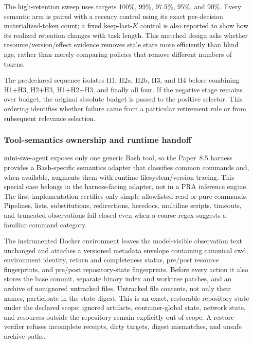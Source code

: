 \documentclass[11pt]{article}
\begin{document}
The high-retention sweep uses targets 100\%, 99\%, 97.5\%, 95\%, and 90\%.
Every semantic arm is paired with a recency control using its exact
per-decision materialized-token count; a fixed keep-last-$K$ control is also
reported to show how its realized retention changes with task length.  This
matched design asks whether resource/version/effect evidence removes stale
state more efficiently than blind age, rather than merely comparing policies
that remove different numbers of tokens.

The predeclared sequence isolates H1, H2a, H2b, H3, and H4 before combining
H1+H3, H2+H3, H1+H2+H3, and finally all four. If the negative stage remains
over budget, the original absolute budget is passed to the positive selector.
This ordering identifies whether failure came from a particular retirement
rule or from subsequent relevance selection.

\subsubsection{Tool-semantics ownership and runtime handoff}

mini-swe-agent exposes only one generic Bash tool, so the Paper~8.5 harness
provides a Bash-specific semantics adapter that classifies common commands and,
when available, augments them with runtime filesystem/version tracing. This
special case belongs in the harness-facing adapter, not in a PRA inference
engine. The first implementation certifies only simple allowlisted read or pure
commands. Pipelines, lists, substitutions, redirections, heredocs, multiline
scripts, timeouts, and truncated observations fail closed even when a coarse
regex suggests a familiar command category.

The instrumented Docker environment leaves the model-visible observation text
unchanged and attaches a versioned metadata envelope containing canonical cwd,
environment identity, return and completeness status, pre/post resource
fingerprints, and pre/post repository-state fingerprints. Before every action
it also stores the base commit, separate binary index and worktree patches, and
an archive of nonignored untracked files. Untracked file contents, not only
their names, participate in the state digest. This is an exact, restorable
repository state under the declared scope; ignored artifacts, container-global
state, network state, and resources outside the repository remain explicitly
out of scope. A restore verifier refuses incomplete receipts, dirty targets,
digest mismatches, and unsafe archive paths.
\end{document}
